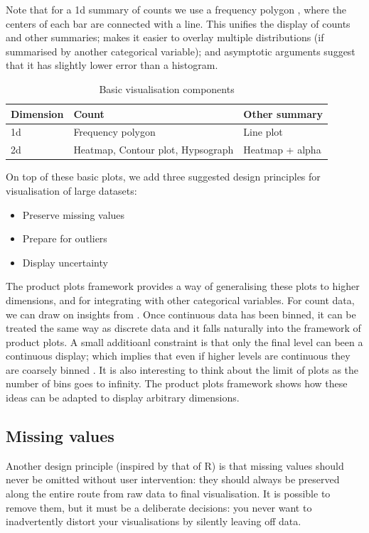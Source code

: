 \documentclass[journal]{vgtc}                %
\begin{document}
Note that for a 1d summary of counts we use a frequency polygon \citep{scott:1985a}, where the centers of each bar are connected with a line. This unifies the display of counts and other summaries; makes it easier to overlay multiple distributions (if summarised by another categorical variable); and asymptotic arguments suggest that it has slightly lower error than a histogram.

\begin{table}
  \scriptsize
  \centering
  \begin{tabular}{lll}
  \toprule
  Dimension & Count & Other summary\\
  \midrule
  1d & Frequency polygon & Line plot \\
  2d & Heatmap, Contour plot, Hypsograph & Heatmap + alpha\\
  \bottomrule
  \end{tabular}
  \caption{Basic visualisation components}
  \label{fig:vis-types}
\end{table}

On top of these basic plots, we add three suggested design principles for visualisation of large datasets:

\begin{itemize}
  \item Preserve missing values
  \item Prepare for outliers
  \item Display uncertainty
\end{itemize}

The product plots \citep{me:prodplots} framework provides a way of generalising these plots to higher dimensions, and for integrating with other categorical variables. For count data, we can draw on insights from . Once continuous data has been binned, it can be treated the same way as discrete data and it falls naturally into the framework of product plots. A small additioanl constraint is that only the final level can been a continuous display; which implies that even if higher levels are continuous they are coarsely binned .  It is also interesting to think about the limit of plots as the number of bins goes to infinity.  The product plots framework shows how these ideas can be adapted to display arbitrary dimensions.

\subsection{Missing values}

Another design principle (inspired by that of R) is that missing values should never be omitted without user intervention: they should always be preserved along the entire route from raw data to final visualisation. It is possible to remove them, but it must be a deliberate decisions: you never want to inadvertently distort your visualisations by silently leaving off data.
\end{document}
